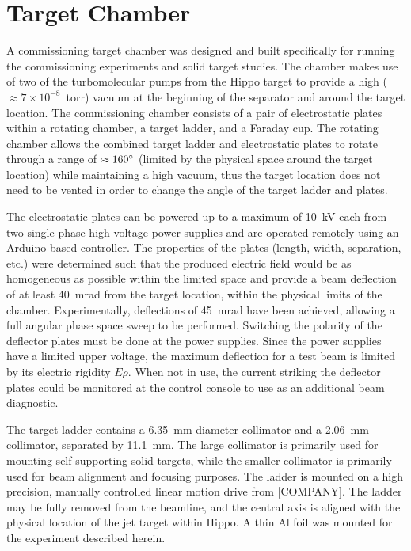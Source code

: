 \section{Target Chamber}
\label{sec:target}

A commissioning target chamber was designed and built specifically for running
the commissioning experiments and solid target studies. The chamber makes use
of two of the turbomolecular pumps from the Hippo target to provide a high
($\approx 7\times 10^{-8}$~torr) vacuum at the beginning of the separator and
around the target location. The commissioning chamber consists of a pair of
electrostatic plates within a rotating chamber, a target ladder, and a Faraday
cup. The rotating chamber allows the combined target ladder and electrostatic
plates to rotate through a range of $\approx 160\degree$ (limited by the
physical space around the target location) while maintaining a high vacuum,
thus the target location does not need to be vented in order to change the
angle of the target ladder and plates.

The electrostatic plates can be powered up to a maximum of 10~kV each from two
single-phase high voltage power supplies and are operated remotely using an
Arduino-based controller. The properties of the plates (length, width,
separation, etc.) were determined such that the produced electric field would
be as homogeneous as possible within the limited space and provide a beam
deflection of at least 40~mrad from the target location, within the physical
limits of the chamber. Experimentally, deflections of 45~mrad have been
achieved, allowing a full angular phase space sweep to be performed. Switching
the polarity of the deflector plates must be done at the power supplies. Since
the power supplies have a limited upper voltage, the maximum deflection for a
test beam is limited by its electric rigidity $E\rho$. When not in use, the
current striking the deflector plates could be monitored at the control console
to use as an additional beam diagnostic.

The target ladder contains a 6.35~mm diameter collimator and a 2.06~mm
collimator, separated by 11.1~mm. The large collimator is primarily used for
mounting self-supporting solid targets, while the smaller collimator is
primarily used for beam alignment and focusing purposes. The ladder is mounted
on a high precision, manually controlled linear motion drive from [COMPANY].
The ladder may be fully removed from the beamline, and the central axis is
aligned with the physical location of the jet target within Hippo. A thin Al
foil was mounted for the experiment described herein.

